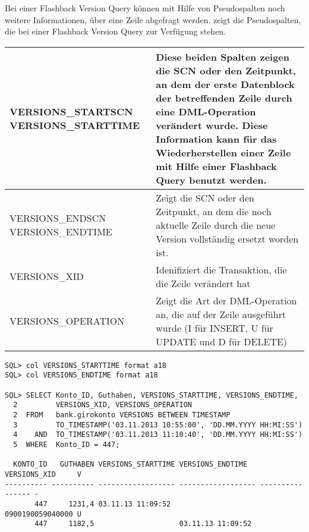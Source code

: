       Bei einer Flashback Version Query k\"onnen mit Hilfe von Pseudospalten noch weitere Informationen, \"uber eine Zeile abgefragt werden.  zeigt die Pseudospalten, die bei einer Flashback Version Query zur Verf\"ugung stehen.
      \begin{center}
        \tablehead{%
        }
        \tabletail{%
          \hline
        }
        \begin{supertabular}[h]{|p{5cm}|p{9,5cm}|}
          \label{flashtable1}
          \raggedright VERSIONS\_STARTSCN VERSIONS\_STARTTIME & \footnotesize Diese beiden Spalten zeigen die SCN oder den Zeitpunkt, an dem der erste Datenblock der betreffenden Zeile durch eine DML-Operation ver\"andert wurde. Diese Information kann f\"ur das Wiederherstellen einer Zeile mit Hilfe einer Flashback Query benutzt werden. \\
          \hline
          \raggedright VERSIONS\_ENDSCN VERSIONS\_ENDTIME & \footnotesize Zeigt die SCN oder den Zeitpunkt, an dem die noch aktuelle Zeile durch die neue Version vollst\"andig ersetzt worden ist. \\
          \hline
          VERSIONS\_XID & \footnotesize Idenifiziert die Transaktion, die die Zeile ver\"andert hat \\
          \hline
          VERSIONS\_OPERATION & \footnotesize Zeigt die Art der DML-Operation an, die auf der Zeile ausgef\"uhrt wurde (I f\"ur  INSERT, U f\"ur UPDATE und D f\"ur DELETE)\\
        \end{supertabular}
      \end{center}
      \begin{lstlisting}[caption={Informationsgewinnung mit Flashback Version Query},label=admin1702,language=oracle_sql,alsolanguage=sqlplus]
SQL> col VERSIONS_STARTTIME format a18 
SQL> col VERSIONS_ENDTIME format a18

SQL> SELECT Konto_ID, Guthaben, VERSIONS_STARTTIME, VERSIONS_ENDTIME,
  2         VERSIONS_XID, VERSIONS_OPERATION
  2  FROM   bank.girokonto VERSIONS BETWEEN TIMESTAMP
  3         TO_TIMESTAMP('03.11.2013 10:55:00', 'DD.MM.YYYY HH:MI:SS')
  4    AND  TO_TIMESTAMP('03.11.2013 11:10:40', 'DD.MM.YYYY HH:MI:SS')
  5  WHERE  Konto_ID = 447;

  KONTO_ID   GUTHABEN VERSIONS_STARTTIME VERSIONS_ENDTIME   VERSIONS_XID     V
---------- ---------- ------------------ ------------------ ---------------- -
       447     1231,4 03.11.13 11:09:52                     0900190059040000 U
       447     1182,5                    03.11.13 11:09:52
      \end{lstlisting}
      \begin{literaturinternet}
        \item \cite{ADFNS01004}
      \end{literaturinternet}
